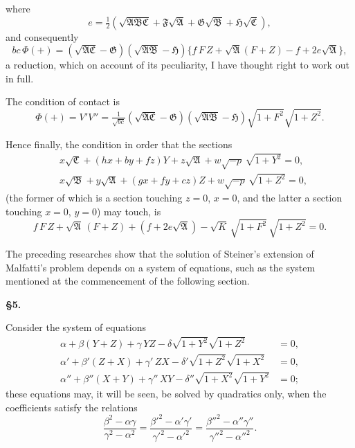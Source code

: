 \documentclass[11pt]{article}
\begin{document}
\newpage
\setcounter{page}{67}

where
\[
e = \tfrac{1}{2}(\sqrt{\mathfrak{A}\mathfrak{B}\mathfrak{C}} + \mathfrak{F}\sqrt{\mathfrak{A}} + \mathfrak{G}\sqrt{\mathfrak{B}} + \mathfrak{H}\sqrt{\mathfrak{C}}),
\]
and consequently
\[
bc\,\Phi(+) = (\sqrt{\mathfrak{A}\mathfrak{C}}-\mathfrak{G})(\sqrt{\mathfrak{A}\mathfrak{B}}-\mathfrak{H})\{f\,F\,Z + \sqrt{\mathfrak{A}}(F+Z) - f + 2e\sqrt{\mathfrak{A}}\},
\]
a reduction, which on account of its peculiarity, I have thought right to work out in full.

The condition of contact is
\[
\Phi(+) = V'V'' = \tfrac{1}{\sqrt{bc}}(\sqrt{\mathfrak{A}\mathfrak{C}}-\mathfrak{G})(\sqrt{\mathfrak{A}\mathfrak{B}}-\mathfrak{H})\sqrt{1+F^2}\sqrt{1+Z^2}.
\]

Hence finally, the condition in order that the sections
\begin{align*}
&x\sqrt{\mathfrak{C}} + (hx+by+fz)Y + z\sqrt{\mathfrak{A}} + w\sqrt{-p}\,\sqrt{1+Y^2} = 0,\\
&x\sqrt{\mathfrak{B}} + y\sqrt{\mathfrak{A}} + (gx+fy+cz)Z + w\sqrt{-p}\,\sqrt{1+Z^2} = 0,
\end{align*}
(the former of which is a section touching $z=0$, $x=0$, and the latter a section touching $x=0$, $y=0$) may touch, is
\[
f\,F\,Z + \sqrt{\mathfrak{A}}\,(F+Z) + (f+2e\sqrt{\mathfrak{A}}) - \sqrt{K}\,\sqrt{1+F^2}\,\sqrt{1+Z^2} = 0.
\]

The preceding researches show that the solution of Steiner's extension of Malfatti's problem depends on a system of equations, such as the system mentioned at the commencement of the following section.

\vspace{0.5em}
\noindent\textbf{\S 5.}

Consider the system of equations
\begin{align*}
\alpha + \beta(Y+Z) + \gamma\,YZ - \delta\sqrt{1+Y^2}\sqrt{1+Z^2} &= 0,\\
\alpha' + \beta'(Z+X) + \gamma'\,ZX - \delta'\sqrt{1+Z^2}\sqrt{1+X^2} &= 0,\\
\alpha'' + \beta''(X+Y) + \gamma''\,XY - \delta''\sqrt{1+X^2}\sqrt{1+Y^2} &= 0;
\end{align*}
these equations may, it will be seen, be solved by quadratics only, when the coefficients satisfy the relations
\[
\frac{\beta^2-\alpha\gamma}{\gamma^2-\alpha^2} = \frac{\beta'^2-\alpha'\gamma'}{\gamma'^2-\alpha'^2} = \frac{\beta''^2-\alpha''\gamma''}{\gamma''^2-\alpha''^2}.
\]
\end{document}
